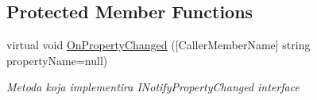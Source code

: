 \subsection*{Protected Member Functions}
\begin{DoxyCompactItemize}
\item 
virtual void \mbox{\hyperlink{class_easy_library_application_1_1_w_p_f_1_1_view_model_1_1_c_r_u_d_book_copies_view_model_a9d5c56ce0c52d131771884e44613dbff}{On\+Property\+Changed}} (\mbox{[}Caller\+Member\+Name\mbox{]} string property\+Name=null)
\begin{DoxyCompactList}\small\item\em Metoda koja implementira I\+Notify\+Property\+Changed interface \end{DoxyCompactList}\end{DoxyCompactItemize}
